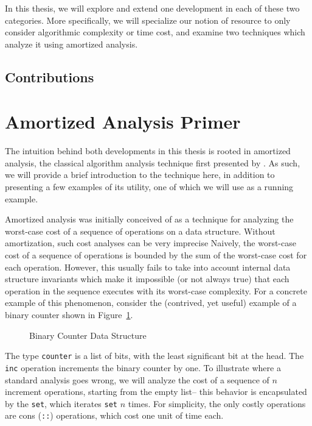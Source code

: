\documentclass[draft]{westhesis}
\begin{document}
In this thesis, we will explore and extend one development in each of these two categories. More specifically, we will specialize our notion of resource to only consider algorithmic complexity or time cost, and examine two techniques which analyze it using amortized analysis.

\subsection{Contributions}


\section{Amortized Analysis Primer}
The intuition behind both developments in this thesis is rooted in amortized analysis, the classical algorithm analysis technique first presented by \citet{tarjan:amortized-complexity}. As such, we will provide a brief introduction to the technique here, in addition to presenting a few examples of its utility, one of which we will use as a running example.

Amortized analysis was initially conceived of as a technique for analyzing the worst-case cost of a sequence of operations on a data structure. Without amortization, such cost analyses can be very imprecise Naively, the worst-case cost of a sequence of operations is bounded by the sum of the worst-case cost for each operation. However, this usually fails to take into account internal data structure invariants which make it impossible (or not always true) that each operation in the sequence executes with its worst-case complexity. For a concrete example of this phenomenon, consider the (contrived, yet useful) example of a binary counter shown in Figure~\ref{fig:bin-counter}.

\begin{figure}
  \caption{Binary Counter Data Structure}
  \label{fig:bin-counter}
\end{figure}

The type \texttt{counter} is a list of bits, with the least significant bit at the head. The \texttt{inc} operation increments the binary counter by one. To illustrate where a standard analysis goes wrong, we will analyze the cost of a sequence of $n$ increment operations, starting from the empty list-- this behavior is encapsulated by the \texttt{set}, which iterates \texttt{set} $n$ times. For simplicity, the only costly operations are cons (\texttt{::}) operations, which cost one unit of time each.
\end{document}
